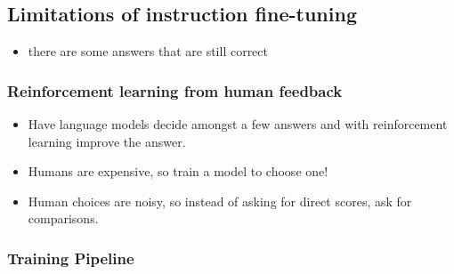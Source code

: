 \documentclass[11pt]{article}
\begin{document}
\subsection{Limitations of instruction fine-tuning}

\begin{minipage}[l]{.5\linewidth}
    \begin{figure}[H]
        \centering
    \end{figure}    
\end{minipage}\hfill
\begin{minipage}[r]{.48\linewidth}
    \begin{itemize}
        \item there are some answers that are still correct
    \end{itemize}
\end{minipage}

\subsubsection{Reinforcement learning from human feedback}

\begin{minipage}[l]{.5\linewidth}
    \begin{figure}[H]
        \centering
    \end{figure}    
\end{minipage}\hfill
\begin{minipage}[r]{.48\linewidth}
    \begin{itemize}
        \item Have language models decide amongst a few answers and with reinforcement learning improve the answer.
    \end{itemize}
\end{minipage}

\begin{minipage}[l]{.5\linewidth}
    \begin{figure}[H]
        \centering
    \end{figure}    
\end{minipage}\hfill
\begin{minipage}[r]{.48\linewidth}
    \begin{itemize}
        \item Humans are expensive, so train a model to choose one! 
        \item Human choices are noisy, so instead of asking for direct scores, ask for comparisons.
    \end{itemize}
\end{minipage}

\subsubsection{Training Pipeline}

\begin{figure}[H]
    \centering
\end{figure}    
\end{document}
